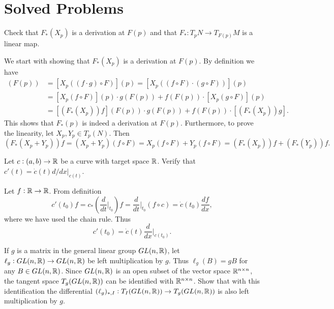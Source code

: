 
\section{Solved Problems}
\begin{problem}
	\label{prob:DifferentialOfAMapIsADerivation}
	Check that $ F_*(X_p) $ is a derivation at $ F(p) $ and that $ F_*: T_p N \to T_{F(p)}M  $ is a linear map.
\end{problem}
\begin{solution}
	We start with showing that $ F_*(X_p) $ is a derivation at $ F(p) $. By definition we have
	\begin{align*}
		[(F_*(X_p))(f\cdot g)](F(p)) &=  [ X_p((f\cdot g)\circ F) ](p) = [ X_p((f\circ F) \cdot (g\circ F)) ](p)\\
		&= [X_p(f\circ F)](p) \cdot g(F(p)) + f(F(p))\cdot [X_p(g\circ F)](p)\\
		&= [(F_*(X_p))f](F(p)) \cdot g(F(p)) + f(F(p))\cdot [(F_*(X_p))g].
	\end{align*}
	This shows that $ F_*(p) $ is indeed a derivation at $ F(p) $. Furthermore, to prove the linearity, let $ X_p, Y_p \in T_p(N) $. Then
	\[ (F_*(X_p + Y_p))f = (X_p + Y_p)(f\circ F) = X_p(f\circ F) + Y_p(f\circ F) = (F_*(X_p)) f + (F_*(Y_p)) f. \]
\end{solution}


\begin{problem}
	\label{prob:VelocutyVecotrAndCalculusNotation}
	Let $ c:(a,b) \to \mathbb{R} $ be a curve with target space $ \mathbb{R} $. Verify that $ c'(t) = \dot{c}(t) d/dx|_{c(t)} $.
\end{problem}
\begin{solution}
	Let $ f: \mathbb{R} \to \mathbb{R} $. From definition 
	\[ c'(t_0) f = c_*(\frac{d}{dt}\big|_{t_0})f = \frac{d}{dt}\big|_{t_0}(f\circ c) = \dot{c}(t_0) \frac{df}{dx}, \]
	where we have used the chain rule. Thus
	\[ c'(t_0) = \dot{c}(t) \frac{d}{dx}\big|_{c(t_0)}. \]
\end{solution}

\begin{problem}
	If $ g $ is a matrix in the general linear group $ GL(n,\mathbb{R}) $, let $ \ell_g: GL(n,\mathbb{R}) \to GL(n,\mathbb{R}) $ be left 
	multiplication by $ g $. Thus $ \ell_g(B) = gB $ for any $ B \in GL(n,\mathbb{R}) $. Since $ GL(n,\mathbb{R}) $ is an open subset of the vector space $ \mathbb{R}^{n\times n} $, the tangent space $ T_g(GL(n,\mathbb{R})) $ can be identified with $ \mathbb{R}^{n\times n} $. Show that with this identification the differential $ (\ell_g)_{*,I}: T_I(GL(n,\mathbb{R})) \to T_g(GL(n,\mathbb{R})) $ is also left multiplication by $ g $. 
\end{problem}